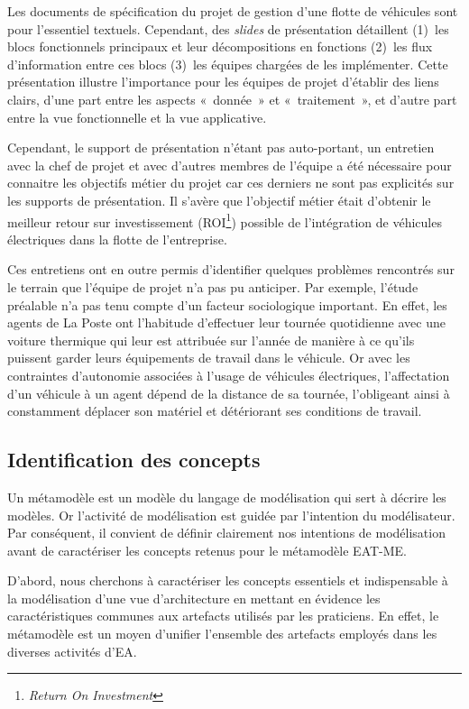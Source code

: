 Les documents de spécification du projet de gestion d'une flotte de véhicules
sont pour l'essentiel textuels. Cependant, des \textit{slides} de présentation
détaillent (1)~les blocs fonctionnels principaux et leur décompositions en
fonctions (2)~les flux d'information entre ces blocs (3)~les équipes chargées
de les implémenter. Cette présentation illustre l'importance pour les équipes
de projet d'établir des liens clairs, d'une part entre les aspects «~donnée~»
et «~traitement~», et d'autre part entre la vue fonctionnelle et la vue
applicative.

Cependant, le support de présentation n'étant pas auto-portant, un entretien
avec la chef de projet et avec d'autres membres de l'équipe a été nécessaire
pour connaitre les objectifs métier du projet car ces derniers ne sont pas
explicités sur les supports de présentation. Il s'avère que l'objectif métier
était d'obtenir le meilleur retour sur investissement
(ROI\footnote{\textit{Return On Investment}}) possible de l'intégration de
véhicules électriques dans la flotte de l'entreprise.

Ces entretiens ont en outre permis d'identifier quelques problèmes rencontrés
sur le terrain que l'équipe de projet n'a pas pu anticiper. Par exemple, l'étude
préalable n'a pas tenu compte d'un facteur sociologique important. En effet,
les agents de La Poste ont l'habitude d'effectuer leur tournée quotidienne avec
une voiture thermique qui leur est attribuée sur l'année de manière à ce qu'ils
puissent garder leurs équipements de travail dans le véhicule. Or avec les
contraintes d'autonomie associées à l'usage de véhicules électriques,
l'affectation d'un véhicule à un agent dépend de la distance de sa tournée,
l'obligeant ainsi à constamment déplacer son matériel et détériorant ses
conditions de travail.

\subsection{Identification des concepts}
    \label{sec:conceptualisation}

    Un métamodèle est un modèle du langage de modélisation qui sert à décrire les modèles.
    Or l'activité de modélisation est guidée par l’intention du modélisateur.
    Par conséquent, il convient de définir clairement nos intentions de modélisation
    avant de caractériser les concepts retenus pour le métamodèle EAT-ME.

    D'abord, nous cherchons à caractériser les concepts essentiels et indispensable à la
    modélisation d'une vue d'architecture en mettant en évidence les caractéristiques communes
    aux artefacts utilisés par les praticiens. En effet, le métamodèle est un moyen d'unifier
    l'ensemble des artefacts employés dans les diverses activités d'EA.

